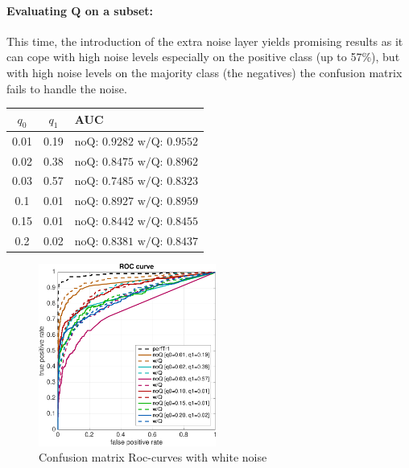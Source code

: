 \documentclass[a4paper]{article}
\newcommand{\Q}{\mathbf{Q}}
\begin{document}
            \paragraph{Evaluating $\Q$ on a subset:}
            This time, the introduction of the extra noise layer yields promising results as it can cope with high noise levels especially on the positive class (up to 57\%), but with high noise levels on the majority class (the negatives) the confusion matrix fails to handle the noise. 
            \begin{minipage}{.4\textwidth}
            \flushright
            \begin{tabular}{|c|c|m{2cm}|}
            \hline
            $q_0$ & $q_1$ & AUC\\
            \hline
            0.01 & 0.19  & $\text{noQ: } 0.9282$ $\text{w/Q: } 0.9552$\\
            \hline
            0.02  & 0.38  &$\text{noQ: } 0.8475$ $\text{w/Q: } 0.8962$\\
            \hline
            0.03  & 0.57  &$\text{noQ: } 0.7485 $ $\text{w/Q: } 0.8323$\\
            \hline
            0.1   & 0.01  &$\text{noQ: } 0.8927 $ $\text{w/Q: } 0.8959$\\
            \hline
            0.15  & 0.01  &$\text{noQ: } 0.8442 $ $\text{w/Q: } 0.8455$\\
            \hline
            0.2   & 0.02  &$\text{noQ: } 0.8381 $ $\text{w/Q: } 0.8437$\\
            \hline
            \end{tabular}
            \end{minipage}\hspace{20pt}
            \begin{minipage}{.4\textwidth}
            \begin{figure}[H]
            \centering
                \includegraphics[height=6cm]{figures/exp3/roc}
                \caption{Confusion matrix Roc-curves with white noise}
            \end{figure}
            \end{minipage}
            
\end{document}
